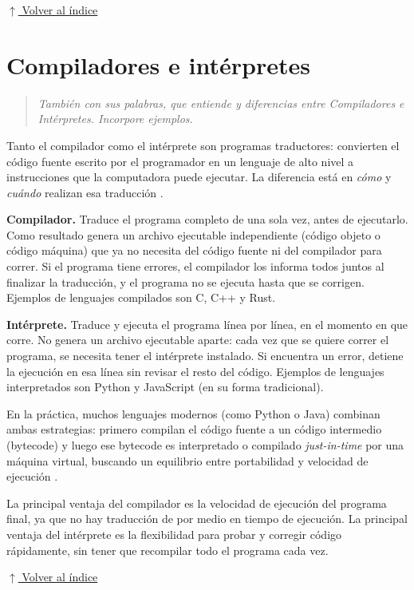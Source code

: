 \documentclass[12pt]{article}
\newcommand{\volverindice}{%
    \vspace{1em}%
    \begin{flushright}%
        \hyperlink{indice}{\small $\uparrow$ Volver al índice}%
    \end{flushright}%
}
\newcommand{\enunciado}[1]{%
    \begin{quote}
        \itshape #1
    \end{quote}
}
\begin{document}
\volverindice
\newpage


\section{Compiladores e intérpretes}

\enunciado{También con sus palabras, que entiende y diferencias entre Compiladores e Intérpretes. Incorpore ejemplos.}

Tanto el compilador como el intérprete son programas traductores: convierten el código fuente escrito por el programador en un lenguaje de alto nivel a instrucciones que la computadora puede ejecutar. La diferencia está en \emph{cómo} y \emph{cuándo} realizan esa traducción \parencite{joyanes2008fundamentos}.

\textbf{Compilador.} Traduce el programa completo de una sola vez, antes de ejecutarlo. Como resultado genera un archivo ejecutable independiente (código objeto o código máquina) que ya no necesita del código fuente ni del compilador para correr. Si el programa tiene errores, el compilador los informa todos juntos al finalizar la traducción, y el programa no se ejecuta hasta que se corrigen. Ejemplos de lenguajes compilados son C, C++ y Rust.

\textbf{Intérprete.} Traduce y ejecuta el programa línea por línea, en el momento en que corre. No genera un archivo ejecutable aparte: cada vez que se quiere correr el programa, se necesita tener el intérprete instalado. Si encuentra un error, detiene la ejecución en esa línea sin revisar el resto del código. Ejemplos de lenguajes interpretados son Python y JavaScript (en su forma tradicional).

En la práctica, muchos lenguajes modernos (como Python o Java) combinan ambas estrategias: primero compilan el código fuente a un código intermedio (bytecode) y luego ese bytecode es interpretado o compilado \emph{just-in-time} por una máquina virtual, buscando un equilibrio entre portabilidad y velocidad de ejecución \parencite{cairo2005metodologia}.

La principal ventaja del compilador es la velocidad de ejecución del programa final, ya que no hay traducción de por medio en tiempo de ejecución. La principal ventaja del intérprete es la flexibilidad para probar y corregir código rápidamente, sin tener que recompilar todo el programa cada vez.

\volverindice
\newpage
\end{document}
